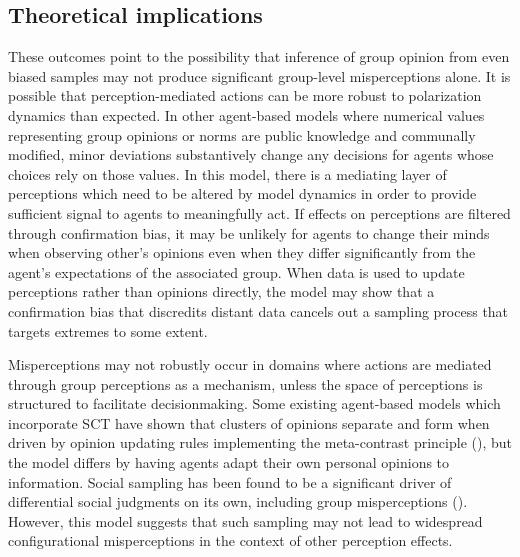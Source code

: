 
\subsection{Theoretical implications}

These outcomes point to the possibility that inference of group opinion from even biased samples may not produce significant group-level misperceptions alone. 
It is possible that perception-mediated actions can be more robust to polarization dynamics than expected. In other agent-based models where numerical values representing group opinions or norms are public knowledge and communally modified, minor deviations substantively change any decisions for agents whose choices rely on those values. In this model, there is a mediating layer of perceptions which need to be altered by model dynamics in order to provide sufficient signal to agents to meaningfully act. If effects on perceptions are filtered through confirmation bias, it may be unlikely for agents to change their minds when observing other's opinions even when they differ significantly from the agent's expectations of the associated group. 
When data is used to update perceptions rather than opinions directly, the model may show that a confirmation bias that discredits distant data cancels out a sampling process that targets extremes to some extent. 

Misperceptions may not robustly occur in domains where actions are mediated through group perceptions as a mechanism, unless the space of perceptions is structured to facilitate decisionmaking. 
Some existing agent-based models which incorporate SCT have shown that clusters of opinions separate and form when driven by opinion updating rules implementing the meta-contrast principle (\cite{salzarulo_continuous_2006}), 
but the model differs by having agents adapt their own personal opinions to information. 
Social sampling has been found to be a significant driver of differential social judgments on its own, including group misperceptions (\cite{galesic_sampling_2018}). 
However, this model suggests that such sampling may not lead to widespread configurational misperceptions in the context of other perception effects. 

